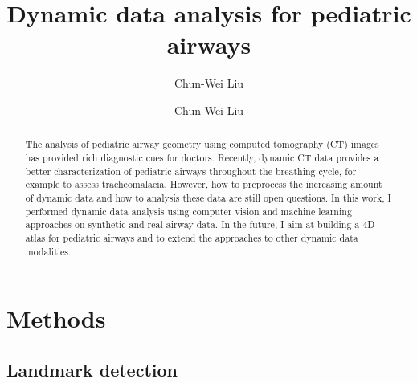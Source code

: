 \documentclass{llncs}
\begin{document}
%
\frontmatter          %
%
\pagestyle{empty}  %
%
\mainmatter              %
%
\title{Dynamic data analysis for pediatric airways}
%
%
\author{Chun-Wei Liu}
%
%
%

\author{Chun-Wei Liu}

\maketitle              %

\begin{abstract}
The analysis of pediatric airway geometry using computed tomography (CT) images has provided rich diagnostic cues for doctors. Recently, dynamic CT data provides a better characterization of pediatric airways throughout the breathing cycle, for example to assess tracheomalacia. However, how to preprocess the increasing amount of dynamic data and how to analysis these data are still open questions. In this work, I performed dynamic data analysis using computer vision and machine learning approaches on synthetic and real airway data. In the future, I aim at building a 4D atlas for pediatric airways and to extend the approaches to other dynamic data modalities.
\end{abstract}



\section{Methods}
\label{sec:methods}

\subsection{Landmark detection}
\label{sec:landmark_detection}
\end{document}
